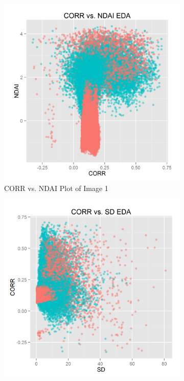 \documentclass{article}\usepackage[]{graphicx}\usepackage[]{color}
\begin{document}
\begin{figure}[h]
  \centering 
  \begin{subfigure}[b]{0.3\textwidth}
    \includegraphics[width=\linewidth]{CORR_vs_NDAI.png}
    \caption{CORR vs. NDAI Plot of Image 1}
    \label{CorrNdai}
  \end{subfigure} 
  \begin{subfigure}[b]{0.3\textwidth}
    \includegraphics[width=\linewidth]{CORR_vs_SD.png}

\end{subfigure}
\end{figure}
\end{document}
